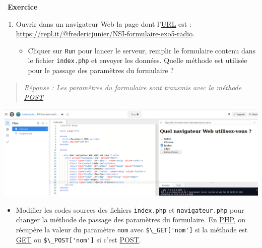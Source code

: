 \documentclass[
  11pt,
]{article}
\newcommand{\passthrough}[1]{#1}
\providecommand{\tightlist}{%
  \setlength{\itemsep}{0pt}\setlength{\parskip}{0pt}}
\newcounter{exo}
\newenvironment{exercice}[1]
{\par \medskip   \addtocounter{exo}{1} \noindent  
\begin{bclogo}[arrondi =0.1,   noborder = true, logo=\bccrayon, marge=4]{~\textbf{Exercice} \textbf{\theexo} {\itshape #1} }  \par}
{
\end{bclogo}
 \par \bigskip }
\newcounter{def}
\begin{document}
\begin{exercice}{}

\begin{enumerate}
\def\labelenumi{\arabic{enumi}.}
\tightlist
\item
  Ouvrir dans un navigateur Web la page dont
  l'\href{https://developer.mozilla.org/fr/docs/Glossaire/URL}{URL} est
  :\\
  \url{https://repl.it/@fredericjunier/NSI-formulaire-exo5-radio}.

  \begin{itemize}
  \tightlist
  \item
    Cliquer sur \passthrough{\lstinline!Run!} pour lancer le serveur,
    remplir le formulaire contenu dans le fichier
    \passthrough{\lstinline!index.php!} et envoyer les données. Quelle
    méthode est utilisée pour le passage des paramètres du formulaire ?
  \end{itemize}
\end{enumerate}

\begin{quote}
\emph{Réponse : Les paramètres du formulaire sont transmis avec la
méthode \url{POST} }
\end{quote}

\includegraphics{images/formulaire_replit.png}\\

\begin{itemize}
\tightlist
\item
  Modifier les codes sources des fichiers
  \passthrough{\lstinline!index.php!} et
  \passthrough{\lstinline!navigateur.php!} pour changer la méthode de
  passage des paramètres du formulaire. En
  \href{https://developer.mozilla.org/fr/docs/Glossaire/PHP}{PHP}, on
  récupère la valeur du paramètre \passthrough{\lstinline!nom!} avec
  \passthrough{\lstinline!$\_GET['nom']!} si la méthode est
  \href{https://developer.mozilla.org/fr/docs/Web/HTTP/M\%C3\%A9thode/GET}{GET}
  ou \passthrough{\lstinline!$\_POST['nom']!} si c'est
  \href{https://developer.mozilla.org/fr/docs/Web/HTTP/M\%C3\%A9thode/POST}{POST}.
\end{itemize}


\end{exercice}
\end{document}
